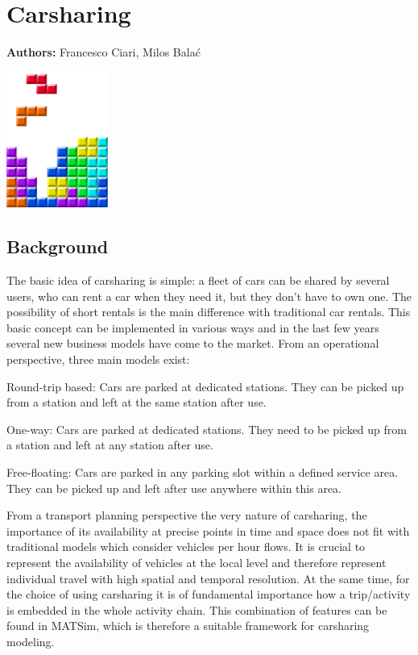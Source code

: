 \chapter{Carsharing}
\label{ch:carsharing}

\hfill \textbf{Authors:} Francesco Ciari, Milos Balać

\begin{center} \includegraphics[width=0.25\textwidth, angle=0]{figures/MATSimBook.png} \end{center}

\section{Background}
The basic idea of carsharing is simple: a fleet of cars can be shared by several users, who can rent a car when they need it, but they don’t have to own one. The possibility of short rentals is the main difference with traditional car rentals. This basic concept can be implemented in various ways and in the last few years several new business models have come to the market. From an operational perspective, three main models exist:
%
\begin{compactitem}
	\item Round-trip based: Cars are parked at dedicated stations. They can be picked up from a station and left at the same station after use.
	\item One-way: Cars are parked at dedicated stations. They need to be picked up from a station and left at any station after use.
	\item Free-floating: Cars are parked in any parking slot within a defined service area. They can be picked up and left after use anywhere within this area. 
\end{compactitem}
%
From a transport planning perspective the very nature of carsharing, the importance of its availability at precise points in time and space does not fit with traditional models which consider vehicles per hour flows. It is crucial to represent the availability of vehicles at the local level and therefore represent individual travel with high spatial and temporal resolution. At the same time, for the choice of using carsharing it is of fundamental importance how a trip/activity is embedded in the whole activity chain. This combination of features can be found in MATSim, which is therefore a suitable framework for carsharing modeling. 

